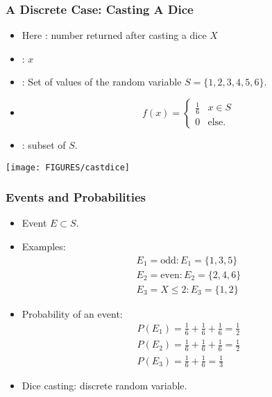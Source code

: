 \documentclass[9pt]{beamer}
\newcommand{\myemph}[1]{{\color{blue}{#1}}}
\begin{document}
\begin{frame}\frametitle{A Discrete Case: Casting A Dice}
  \begin{itemize}
  \item Here \myemph{random variable}: number returned after casting a dice $X$\vfill
  \item \myemph{Observed value}: $x$\vfill
  \item \myemph{State space}: Set of values of the random variable $S = \{1,2,3,4,5,6\}$.\vfill
  \item \myemph{Probability mass function}
    $$
    f(x) =
    \begin{cases}
      \frac16&x\in S\\
      0 & \text{else}.
    \end{cases}
    $$\vfill
  \item \myemph{Event}: subset of $S$.
  \end{itemize}
  \begin{center}
    \texttt{[image: FIGURES/castdice]}
  \end{center}
\end{frame}


\begin{frame}\frametitle{Events and Probabilities}
  \begin{itemize}
  \item Event $E\subset S$.
  \item Examples:
    \begin{align*}
      &E_1 = \text{odd}: E_1 = \{1,3,5\}&\\
      &E_2 = \text{even}: E_2= \{2,4,6\}&\\
      &E_3 = X \leq 2: E_3 = \{1,2\}&
    \end{align*}
  \item Probability of an event:
    \begin{align*}
      &P(E_1) = \frac16 + \frac16 + \frac16 = \frac12&\\
      &P(E_2) = \frac16 + \frac16 + \frac16 = \frac12&\\
      &P(E_3) = \frac16 + \frac16 = \frac13&
    \end{align*}
  \item Dice casting: discrete random variable.
  \end{itemize}
\end{frame}
\end{document}
